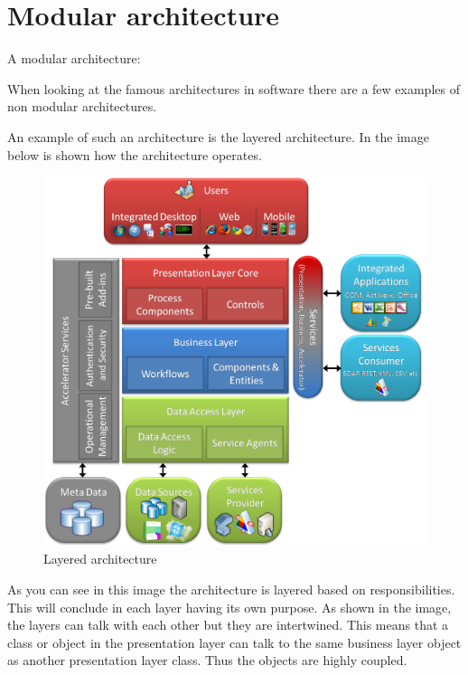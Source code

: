 \chapter{Modular architecture}
\label{sec:ModularArchitecture}

A modular architecture:

When looking at the famous architectures in software there are a few examples of non
modular architectures.

An example of such an architecture is the layered architecture. In the image below is shown how the architecture operates.

\begin{figure}[H]
	\includegraphics[width=\linewidth]{layered_architecture.png}
	\caption{Layered architecture \cite{layeredArchitecture}}
\end{figure}

As you can see in this image the architecture is layered based on responsibilities. This will conclude in each layer having its own purpose. As shown in the image, the layers can talk with each other but they are intertwined. This means that a class or object in the presentation layer can talk to the same business layer object as another presentation layer class. Thus the objects are highly coupled.


